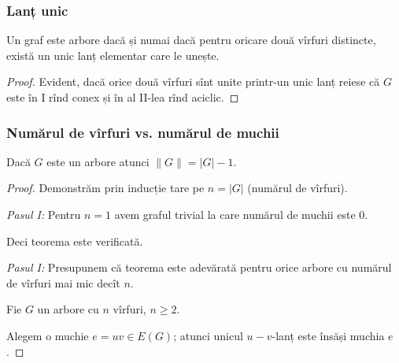 \begin{frame}
  \frametitle{Lanț unic}

\begin{corollary}
Un graf este arbore dacă și numai dacă pentru oricare două vîrfuri distincte, 
există un unic lanț elementar care le unește.
\end{corollary}\pause

\begin{proof}
Evident, dacă orice două vîrfuri sînt unite printr-un unic lanț reiese că $G$ 
este în I rînd conex și în al II-lea rînd aciclic.
\end{proof}
 
\end{frame}

\begin{frame}
  \frametitle{Numărul de vîrfuri vs. numărul de muchii}

 \begin{theorem}\label{GTA-2.1}
Dacă $G$ este un arbore atunci $\|G\|=|G|-1$.
\end{theorem}\pause

\begin{proof}
Demonstrăm prin inducție tare pe $n=|G|$ (numărul de vîrfuri).\pause

\emph{Pasul I:} Pentru $n=1$ avem graful trivial la care numărul de muchii este 0. \pause

Deci teorema este verificată.\pause

\emph{Pasul I:} Presupunem că teorema este adevărată pentru orice arbore cu numărul de vîrfuri mai mic decît $n$. \pause

Fie $G$ un arbore cu $n$ vîrfuri, $n\geq 2$. \pause

Alegem o muchie $e=uv\in E(G)$; atunci unicul $u-v$-lanț este însăși muchia $e$.


\end{proof}

\end{frame}



